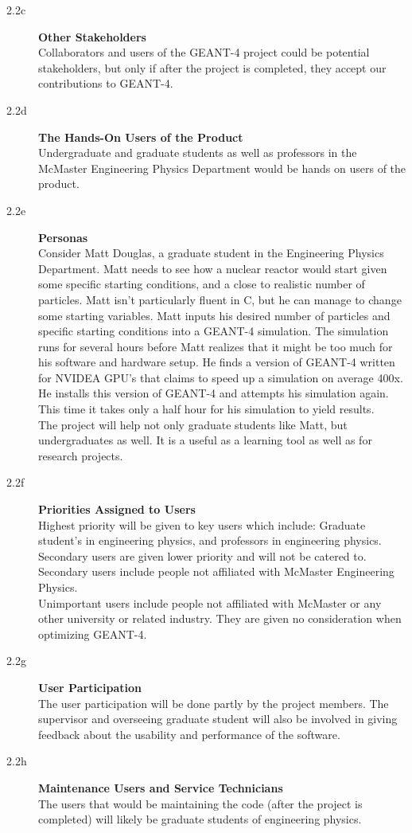 \documentclass[12pt]{article}
\begin{document}
\begin{description}
  \item[2.2c] \textbf{Other Stakeholders} \\
	Collaborators and users of the GEANT-4 project could be potential stakeholders, but only if after the project is completed, they 	accept our contributions to GEANT-4. \\
  \item[2.2d] \textbf{The Hands-On Users of the Product} \\
	Undergraduate and graduate students as well as professors in the McMaster Engineering Physics Department would be hands 			on users of the product. 
 \item[2.2e] \textbf{Personas} \\
	Consider Matt Douglas, a graduate student in the Engineering Physics Department. Matt needs to see how a nuclear reactor 			would start given some specific starting conditions, and a close to realistic number of particles. Matt isn't particularly fluent in 			C, but he can manage to change some starting variables. Matt inputs his desired number of particles and specific starting 			conditions into a GEANT-4 simulation. The simulation runs for several hours before Matt realizes that it might be too much for 			his software and hardware setup. He finds a version of GEANT-4 written for NVIDEA GPU's that claims to speed up a simulation 	on average 400x. He installs this version of GEANT-4 and attempts his simulation again. This time it takes only a half hour for 			his simulation to yield results. \\
	The project will help not only graduate students like Matt, but undergraduates as well. It is a useful as a learning tool as well as 	for research projects. \\
 \item[2.2f] \textbf{Priorities Assigned to Users}\\
	Highest priority will be given to key users which include: Graduate student's in engineering physics, and professors in 				engineering physics.\\
	Secondary users are given lower priority and will not be catered to. Secondary users include people not affiliated with 				McMaster Engineering Physics. \\
	Unimportant users include people not affiliated with McMaster or any other university or related industry. They are given no 			consideration when optimizing GEANT-4. \\	
\item[2.2g] \textbf{User Participation} \\
	The user participation will be done partly by the project members. The supervisor and overseeing graduate student will also be 		involved in giving feedback about the usability and performance of the software. \\
\item[2.2h] \textbf{Maintenance Users and Service Technicians} \\
	The users that would be maintaining the code (after the project is completed) will likely be graduate students of engineering physics. \\
\end{description}
\end{document}
